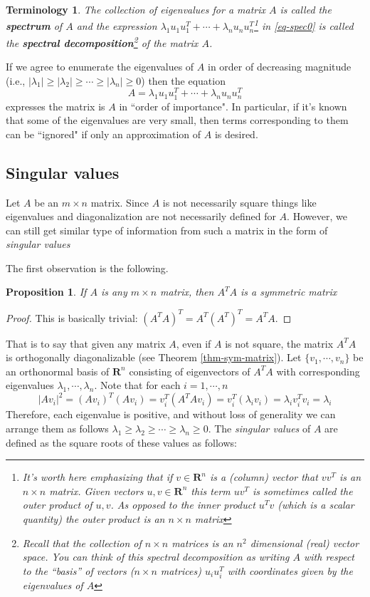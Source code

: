 \documentclass[12pt]{article}
\numberwithin{equation}{subsection}
\numberwithin{figure}{subsection}
\newtheorem{prop}[subsection]{Proposition}
\theoremstyle{note}
\newtheorem{terminology}[subsection]{Terminology}
\newcommand{\R}{\mathbf{R}}
\begin{document}
\begin{terminology} The collection of eigenvalues for a matrix $A$ is called the \textbf{spectrum} of $A$ and the expression $\lambda_1 u_1u_1^T + \cdots + \lambda_n u_nu_n^T$\footnote{It's worth here emphasizing that if $v\in \R^n$ is a (column) vector that $vv^T$ is an $n\times n$ matrix. Given vectors $u,v\in \R^n$ this term $uv^T$ is sometimes called the \textit{outer product} of $u,v$. As opposed to the \textit{inner product} $u^Tv$ (which is a scalar quantity) the outer product is an $n\times n$ matrix} in \eqref{eq-spec0} is called the \textbf{spectral decomposition}\footnote{Recall that the collection of $n\times n$ matrices is an $n^2$ dimensional (real) vector space. You can think of this spectral decomposition as writing $A$ with respect to the ``basis'' of vectors ($n\times n$ matrices) $u_iu_i^T$ with coordinates given by the eigenvalues of $A$} of the matrix $A$.\end{terminology}

If we agree to enumerate the eigenvalues of $A$ in order of decreasing magnitude  (i.e., $|\lambda_1|\geq |\lambda_2|\geq \cdots\geq |\lambda_n|\geq 0$) then the equation \begin{equation}\label{eq-spec} A=\lambda_1 u_1u_1^T + \cdots + \lambda_n u_nu_n^T\end{equation} 
expresses the matrix is $A$ in ``order of importance". In particular, if it's known that some of the eigenvalues are very small, then terms corresponding to them can be ``ignored" if only an approximation of $A$ is desired. 


\subsection{Singular values}
Let $A$ be an $m\times n$ matrix. Since $A$ is not necessarily square things like eigenvalues and diagonalization are not necessarily defined for $A$. However, we can still get similar type of information from such a matrix in the form of \textit{singular values}

The first observation is the following. 
\begin{prop} If $A$ is any $m\times n$ matrix, then $A^TA$ is a symmetric matrix 
\end{prop}
\begin{proof} This is basically trivial: $(A^TA)^T=A^T(A^T)^T=A^TA$.
\end{proof}

That is to say that given any matrix $A$, even if $A$ is not square, the matrix $A^TA$ is orthogonally diagonalizable (see Theorem \ref{thm-sym-matrix}). Let $\{v_1,\cdots,v_n\}$ be an orthonormal basis of $\R^n$ consisting of eigenvectors of $A^TA$ with corresponding eigenvalues $\lambda_1,\cdots,\lambda_n$. 
Note that for each $i=1,\cdots,n$ \begin{equation}
	|Av_i|^2=(Av_i)^T(Av_i)=v_i^T(A^TAv_i)=v_i^T(\lambda_iv_i)=\lambda_i v_i^Tv_i=\lambda_i
\end{equation}
Therefore, each eigenvalue is positive, and without loss of generality we can arrange them as follows $\lambda_1 \geq \lambda_2\geq \cdots \geq \lambda_n\geq 0$. The \textit{singular values} of $A$ are defined as the square roots of these values as follows:
\end{document}
